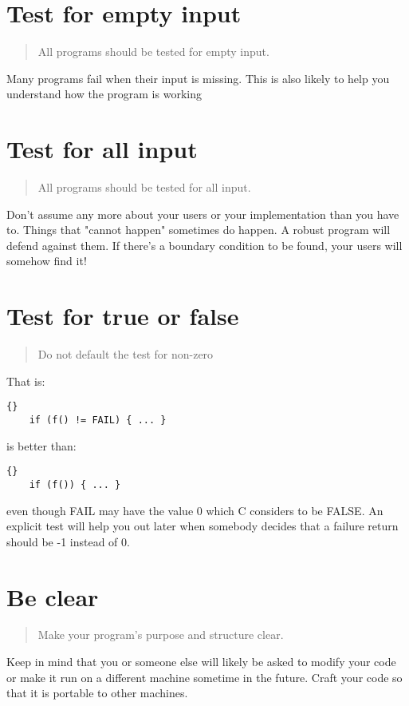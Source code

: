 \documentclass{report}
\begin{document}
\section{Test for empty input}
\begin{quote}
All programs should be tested for empty input.
\end{quote}
Many programs fail when their input is missing. This is also likely to help you understand how the program is working 

\section{Test for all input}
\begin{quote}
All programs should be tested for all input.
\end{quote}
Don't assume any more about your users or your implementation than you have to. Things that "cannot happen" sometimes do happen. A robust program will defend against them. If there's a boundary condition to be found, your users will somehow find it! 

\section{Test for true or false}
\begin{quote}
Do not default the test for non-zero
\end{quote}
That is: 
\begin{lstlisting}{}
    if (f() != FAIL) { ... }
\end{lstlisting}
is better than:
\begin{lstlisting}{}
    if (f()) { ... }
\end{lstlisting}
even though FAIL may have the value 0 which C considers to be FALSE. An explicit test will help you out later when somebody decides that a failure return should be -1 instead of 0.

\section{Be clear}
\begin{quote}
Make your program's purpose and structure clear.
\end{quote}
Keep in mind that you or someone else will likely be asked to modify your code or make it run on a different machine sometime in the future. Craft your code so that it is portable to other machines.
\end{document}
